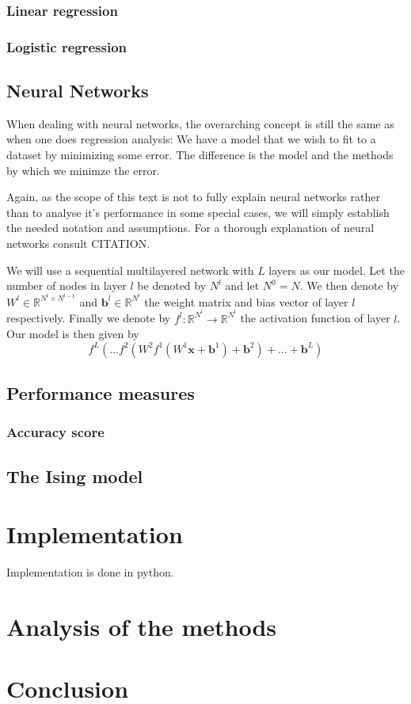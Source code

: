 \documentclass[a4paper,norsk]{article}
\begin{document}
\subsubsection{Linear regression}
\subsubsection{Logistic regression}


\subsection{Neural Networks}
When dealing with neural networks, the overarching concept is still the 
same as when one does regression analysis: We have a model that we wish 
to fit to a dataset by minimizing some error. The difference 
is the model and the methods by which we minimze the error.
\par
Again, as the scope of this text is not to fully explain neural networks
rather than to analyse it's performance in some special cases, we will
simply establish the needed notation and assumptions. For a thorough
explanation of neural networks consult CITATION.
\par
We will use a sequential multilayered network with $L$ layers as our model.
Let the number of nodes in layer $l$ be denoted by $N^l$ and let 
$N^0 = N$. We then denote
by $W^l \in \mathbb{R}^{N^l \times N^{l-1}}$ and 
$\bm{b}^l \in \mathbb{R}^{N^l}$ the weight matrix and bias 
vector of layer $l$ respectively. 
Finally we denote by $f^l: \mathbb{R}^{N^l} \rightarrow \mathbb{R}^{N^l}$ 
the activation function of 
layer $l$. Our model is then given by
\begin{equation}
    f^L( \dots f^2(W^2 f^1(W^1 \bm{x} + \bm{b}^1) + \bm{b}^2) 
    + \dots + \bm{b}^L)
\end{equation}

\subsection{Performance measures}

\subsubsection{Accuracy score}

\subsection{The Ising model}

\section{Implementation}
Implementation is done in python.

\section{Analysis of the methods}

\section{Conclusion}

{}

\end{document}
